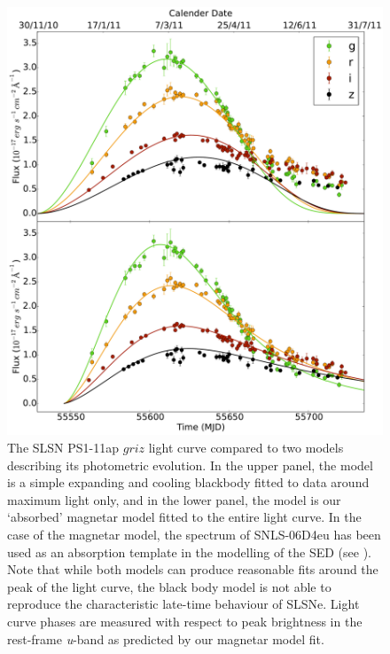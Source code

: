 \begin{figure}
\includegraphics[width=\textwidth]{Figures/Chapter3/BB_Mag_comp}
\caption{The SLSN PS1-11ap $griz$ light curve \citep{McCrum2014} compared to two models describing its photometric evolution. In the upper panel, the model is a simple expanding and cooling blackbody fitted to data around maximum light only, and in the lower panel, the model is our `absorbed' magnetar model fitted to the entire light curve. In the case of the magnetar model, the spectrum of SNLS-06D4eu \citep{Howell2013} has been used as an absorption template in the modelling of the SED (see ). Note that while both models can produce reasonable fits around the peak of the light curve, the black body model is not able to reproduce the characteristic late-time behaviour of SLSNe. Light curve phases are measured with respect to peak brightness in the rest-frame \textit{u}-band as predicted by our magnetar model fit.}
\label{fig:BB_Mag}
\end{figure}

